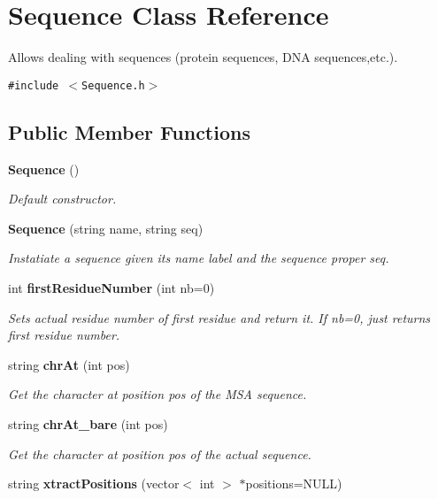 \section{Sequence Class Reference}
\label{classSequence}
Allows dealing with sequences (protein sequences, DNA sequences,etc.).  


{\tt \#include $<$Sequence.h$>$}

\subsection*{Public Member Functions}
\begin{CompactItemize}
\item 
{\bf Sequence} ()\label{classSequence_a0}

\begin{CompactList}\small\item\em Default constructor. \item\end{CompactList}\item 
{\bf Sequence} (string name, string seq)\label{classSequence_a1}

\begin{CompactList}\small\item\em Instatiate a sequence given its name label and the sequence proper seq. \item\end{CompactList}\item 
int {\bf first\-Residue\-Number} (int nb=0)\label{classSequence_a2}

\begin{CompactList}\small\item\em Sets actual residue number of first residue and return it. If nb=0, just returns first residue number. \item\end{CompactList}\item 
string {\bf chr\-At} (int pos)\label{classSequence_a3}

\begin{CompactList}\small\item\em Get the character at position pos of the MSA sequence. \item\end{CompactList}\item 
string {\bf chr\-At\_\-bare} (int pos)\label{classSequence_a4}

\begin{CompactList}\small\item\em Get the character at position pos of the actual sequence. \item\end{CompactList}\item 
string {\bf xtract\-Positions} (vector$<$ int $>$ $\ast$positions=NULL)\label{classSequence_a5}


\end{CompactItemize}
